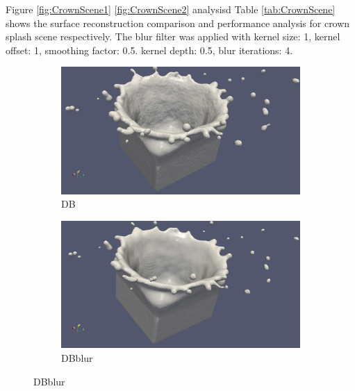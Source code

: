 Figure \ref{fig:CrownScene1} \ref{fig:CrownScene2} analysisd Table \ref{tab:CrownScene} shows the surface reconstruction comparison  and performance analysis for crown splash scene respectively. The blur filter was applied with kernel size: 1, kernel offset: 1, smoothing factor: 0.5. kernel depth: 0.5, blur iterations: 4.
\begin{figure}
	\begin{center}
        \begin{subfigure}[b]{\textwidth}
               \includegraphics[width=\textwidth]{figures/CrownOriginal.png}
				\caption{DB}
        \end{subfigure}
        \begin{subfigure}[b]{\textwidth}
               \includegraphics[width=\textwidth]{figures/CrownBlurred.png}
				\caption{DBblur}
        \end{subfigure}
	\end{center}
\end{figure}
